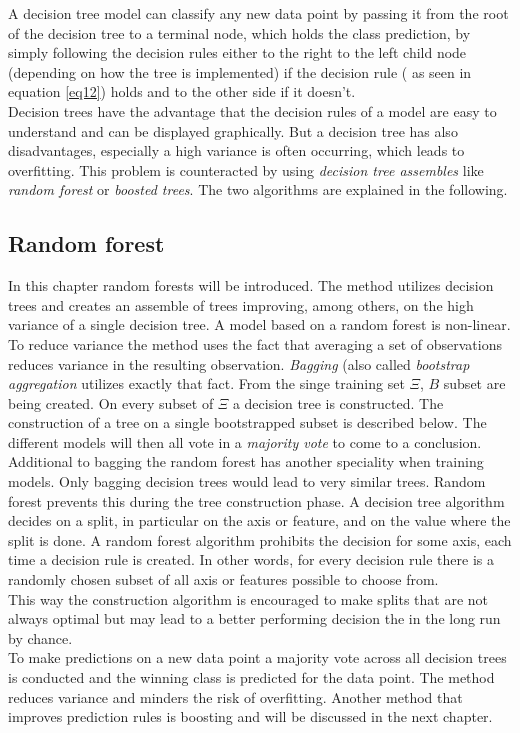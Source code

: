 A decision tree model can classify any new data point by passing it from the root of the decision tree to a terminal node, which holds the class prediction, by simply following the decision rules either to the right to the left child node (depending on how the tree is implemented) if the decision rule ( as seen in equation \ref{eq12}) holds and to the other side if it doesn't.\\
Decision trees have the advantage that the decision rules of a model are easy to understand and can be displayed graphically. 
But a decision tree has also disadvantages, especially a high variance is often occurring, which leads to overfitting. This problem is counteracted by using \emph{decision tree assembles} like \emph{random forest} or \emph{boosted trees}. The two algorithms are explained in the following.


\subsection{Random forest}

In this chapter random forests will be introduced. The method utilizes decision trees and creates an assemble of trees improving, among others, on the high variance of a single decision tree. 
A model based on a random forest is non-linear.
\\
To reduce variance the method uses the fact that averaging a set of observations reduces variance in the resulting observation.
\emph{Bagging} (also called \emph{bootstrap aggregation} utilizes exactly that fact. From the singe training set $\Xi$, $B$ subset are being created. On every subset of $\Xi$ a decision tree is constructed. The construction of a tree on a single bootstrapped subset is described below. The different models will then all vote in a \emph{majority vote} to come to a conclusion.
\\
Additional to bagging the random forest has another speciality when training models. Only bagging decision trees would lead to very similar trees.
Random forest prevents this during the tree construction phase. A decision tree algorithm decides on a split, in particular on the axis or feature, and on the value where the split is done. A random forest algorithm prohibits the decision for some axis, each time a decision rule is created. In other words, for every decision rule there is a randomly chosen subset of all axis or features possible to choose from.\\
This way the construction algorithm is encouraged to make splits that are not always optimal but may lead to a better performing decision the in the long run by chance.
\\
To make predictions on a new data point  a majority vote across all decision trees is conducted and the winning class is predicted for the data point.
The method reduces variance and minders the risk of overfitting. Another method that improves prediction rules is boosting and will be discussed in the next chapter.

